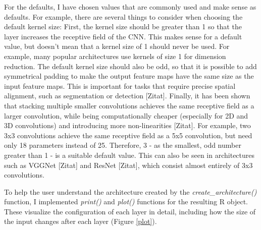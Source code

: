 \documentclass[12pt,twoside]{scrreport}
\newcommand{\fn}[2][]{\textit{#2(}#1\textit{)}}
\begin{document}
For the defaults, I have chosen values that are commonly used and make sense as defaults. For example, there are several things to consider when choosing the default kernel size: First, the kernel size should be greater than 1 so that the layer increases the receptive field of the CNN. This makes sense for a default value, but doesn't mean that a kernel size of 1 should never be used. For example, many popular architectures use kernels of size 1 for dimension reduction. The default kernel size should also be odd, so that it is possible to add symmetrical padding to make the output feature maps have the same size as the input feature maps. This is important for tasks that require precise spatial alignment, such as segmentation or detection [Zitat]. Finally, it has been shown that stacking multiple smaller convolutions achieves the same receptive field as a larger convolution, while being computationally cheaper (especially for 2D and 3D convolutions) and introducing more non-linearities [Zitat]. For example, two 3x3 convolutions achieve the same receptive field as a 5x5 convolution, but need only 18 parameters instead of 25. Therefore, 3 - as the smallest, odd number greater than 1 - is a suitable default value. This can also be seen in architectures such as VGGNet [Zitat] and ResNet [Zitat], which consist almost entirely of 3x3 convolutions.

To help the user understand the architecture created by the \fn{create\_architecture} function, I implemented \fn{print} and \fn{plot} functions for the resulting R object. These visualize the configuration of each layer in detail, including how the size of the input changes after each layer (Figure \ref{plot}).
\end{document}
